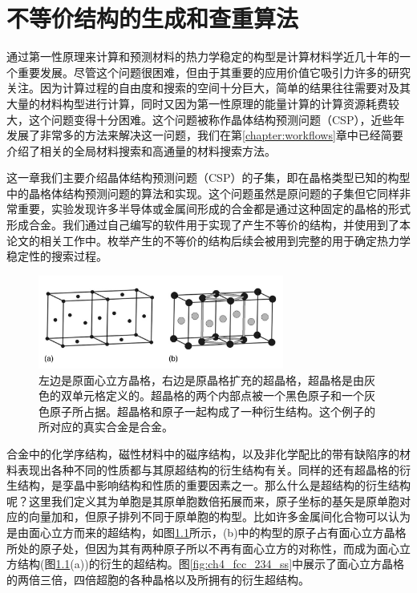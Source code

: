 \chapter{不等价结构的生成和查重算法}
通过第一性原理来计算和预测材料的热力学稳定的构型是计算材料学近几十年的一个重要发展。尽管这个问题很困难，但由于其重要的应用价值它吸引力许多的研究关注。因为计算过程的自由度和搜索的空间十分巨大，简单的结果往往需要对及其大量的材料构型进行计算，同时又因为第一性原理的能量计算的计算资源耗费较大，这个问题变得十分困难。这个问题被称作晶体结构预测问题（CSP），近些年发展了非常多的方法来解决这一问题，我们在第\ref{chapter:workflows}章中已经简要介绍了相关的全局材料搜索和高通量的材料搜索方法。

这一章我们主要介绍晶体结构预测问题（CSP）的子集，即在晶格类型已知的构型中的晶格体结构预测问题的算法和实现。这个问题虽然是原问题的子集但它同样非常重要，实验发现许多半导体或金属间形成的合金都是通过这种固定的晶格的形式形成合金。我们通过自己编写的软件用于实现了产生不等价的结构，并使用到了本论文的相关工作中。枚举产生的不等价的结构后续会被用到完整的用于确定热力学稳定性的搜索过程。

\begin{figure}
  \includegraphics[width=0.72\textwidth]{figs/ch4_fcc_superlattice.png}
  \centering
  \caption{左边是原面心立方晶格，右边是原晶格扩充的超晶格，超晶格是由灰色的双单元格定义的。超晶格的两个内部点被一个黑色原子和一个灰色原子所占据。超晶格和原子一起构成了一种衍生结构。这个例子的所对应的真实合金是合金。}
  \label{fig:ch4_fcc_superlattice}
\end{figure}

合金中的化学序结构，磁性材料中的磁序结构，以及非化学配比的带有缺陷序的材料表现出各种不同的性质都与其原超结构的衍生结构\cite{buerger1947derivative,santoro1973coincidence,santoro1972properties}有关。同样的还有超晶格的衍生结构，是孪晶中影响结构和性质的重要因素之一。那么什么是超结构的衍生结构呢？这里我们定义其为单胞是其原单胞数倍拓展而来，原子坐标的基矢是原单胞对应的向量加和，但原子排列不同于原单胞的构型。比如许多金属间化合物可以认为是由面心立方而来的超结构，如图\ref{fig:ch4_fcc_superlattice}所示，(b)中的构型的原子占有面心立方晶格所处的原子处，但因为其有两种原子所以不再有面心立方的对称性，而成为面心立方结构(图\ref{fig:ch4_fcc_superlattice}(a))的衍生的超结构。图\ref{fig:ch4_fcc_234_ss}中展示了面心立方晶格的两倍三倍，四倍超胞的各种晶格以及所拥有的衍生超结构。


